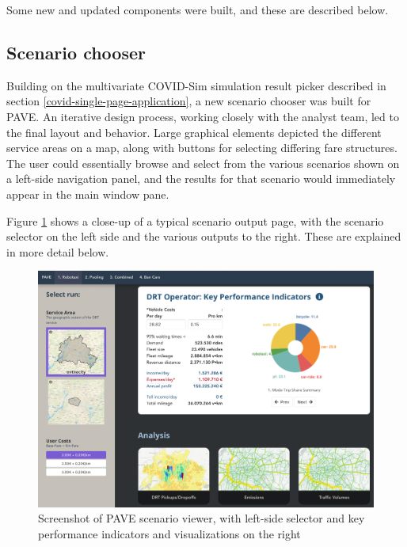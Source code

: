 Some new and updated components were built, and these are described below.

\subsection{Scenario chooser}
\label{pave-scenario-chooser}

Building on the multivariate COVID-Sim simulation result picker described in section \ref{covid-single-page-application}, a new scenario chooser was built for PAVE. An iterative design process, working closely with the analyst team, led to the final layout and behavior. Large graphical elements depicted the different service areas on a map, along with buttons for selecting differing fare structures. The user could essentially browse and select from the various scenarios shown on a left-side navigation panel, and the results for that scenario would immediately appear in the main window pane.

Figure \ref{fig:pave-scenario-chooser} shows a close-up of a typical scenario output page, with the scenario selector on the left side and the various outputs to the right. These are explained in more detail below.

\begin{figure}[ht]
  \centering
  \includegraphics[width=0.95\linewidth]{chapters/23-pave/images/fig-kpi-panel.png}
  \caption{Screenshot of PAVE scenario viewer, with left-side selector and key performance indicators and visualizations on the right}
  \label{fig:pave-scenario-chooser}
\end{figure}

